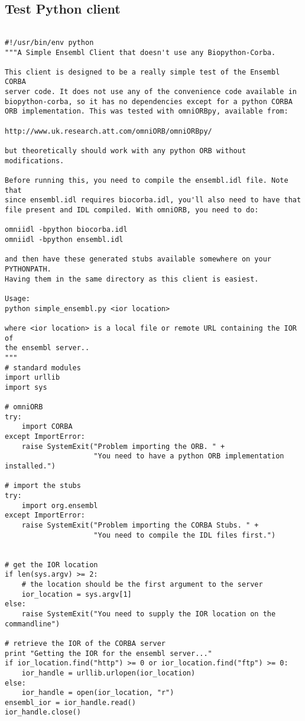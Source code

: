 \documentclass[11pt,a4paper]{article}
\begin{document}
\subsection{Test Python client}

\begin{verbatim}

#!/usr/bin/env python
"""A Simple Ensembl Client that doesn't use any Biopython-Corba.

This client is designed to be a really simple test of the Ensembl CORBA
server code. It does not use any of the convenience code available in
biopython-corba, so it has no dependencies except for a python CORBA
ORB implementation. This was tested with omniORBpy, available from:

http://www.uk.research.att.com/omniORB/omniORBpy/

but theoretically should work with any python ORB without modifications.

Before running this, you need to compile the ensembl.idl file. Note that
since ensembl.idl requires biocorba.idl, you'll also need to have that
file present and IDL compiled. With omniORB, you need to do:

omniidl -bpython biocorba.idl
omniidl -bpython ensembl.idl

and then have these generated stubs available somewhere on your PYTHONPATH.
Having them in the same directory as this client is easiest.

Usage:
python simple_ensembl.py <ior location>

where <ior location> is a local file or remote URL containing the IOR of
the ensembl server..
"""
# standard modules
import urllib
import sys

# omniORB
try:
    import CORBA
except ImportError:
    raise SystemExit("Problem importing the ORB. " +
                     "You need to have a python ORB implementation installed.")

# import the stubs
try:
    import org.ensembl
except ImportError:
    raise SystemExit("Problem importing the CORBA Stubs. " + 
                     "You need to compile the IDL files first.")


# get the IOR location
if len(sys.argv) >= 2:
    # the location should be the first argument to the server
    ior_location = sys.argv[1]
else:
    raise SystemExit("You need to supply the IOR location on the commandline")

# retrieve the IOR of the CORBA server
print "Getting the IOR for the ensembl server..."
if ior_location.find("http") >= 0 or ior_location.find("ftp") >= 0:
    ior_handle = urllib.urlopen(ior_location)
else:
    ior_handle = open(ior_location, "r")
ensembl_ior = ior_handle.read()
ior_handle.close()


\end{verbatim}
\end{document}
